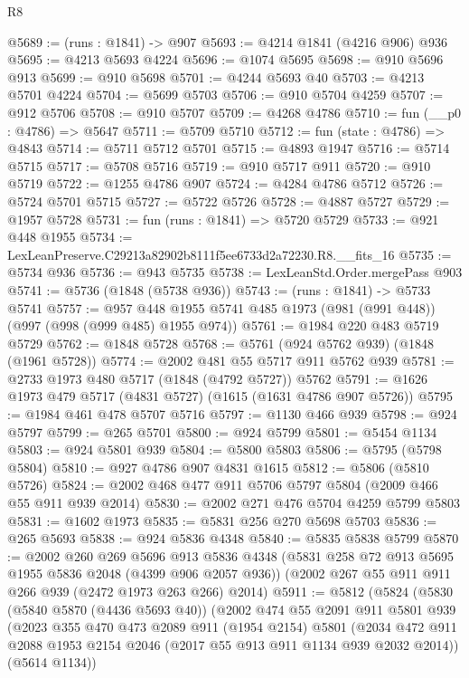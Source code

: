 \begin{lexlean}{R8}
\begin{coremodule}
@5689 := (runs : @1841) -> @907
@5693 := @4214 @1841 (@4216 @906) @936
@5695 := @4213 @5693 @4224
@5696 := @1074 @5695
@5698 := @910 @5696 @913
@5699 := @910 @5698
@5701 := @4244 @5693 @40
@5703 := @4213 @5701 @4224
@5704 := @5699 @5703
@5706 := @910 @5704 @4259
@5707 := @912 @5706
@5708 := @910 @5707
@5709 := @4268 @4786
@5710 := fun (__p0 : @4786) => @5647
@5711 := @5709 @5710
@5712 := fun (state : @4786) => @4843
@5714 := @5711 @5712 @5701
@5715 := @4893 @1947
@5716 := @5714 @5715
@5717 := @5708 @5716
@5719 := @910 @5717 @911
@5720 := @910 @5719
@5722 := @1255 @4786 @907
@5724 := @4284 @4786 @5712
@5726 := @5724 @5701 @5715
@5727 := @5722 @5726
@5728 := @4887 @5727
@5729 := @1957 @5728
@5731 := fun (runs : @1841) => @5720 @5729
@5733 := @921 @448 @1955
@5734 := LexLeanPreserve.C29213a82902b8111f5ee6733d2a72230.R8.__fits_16
@5735 := @5734 @936
@5736 := @943 @5735
@5738 := LexLeanStd.Order.mergePass @903
@5741 := @5736 (@1848 (@5738 @936))
@5743 := (runs : @1841) -> @5733 @5741
@5757 := @957 @448 @1955 @5741 @485 @1973 (@981 (@991 @448)) (@997 (@998 (@999 @485) @1955 @974))
@5761 := @1984 @220 @483 @5719 @5729
@5762 := @1848 @5728
@5768 := @5761 (@924 @5762 @939) (@1848 (@1961 @5728))
@5774 := @2002 @481 @55 @5717 @911 @5762 @939
@5781 := @2733 @1973 @480 @5717 (@1848 (@4792 @5727)) @5762
@5791 := @1626 @1973 @479 @5717 (@4831 @5727) (@1615 (@1631 @4786 @907 @5726))
@5795 := @1984 @461 @478 @5707 @5716
@5797 := @1130 @466 @939
@5798 := @924 @5797
@5799 := @265 @5701
@5800 := @924 @5799
@5801 := @5454 @1134
@5803 := @924 @5801 @939
@5804 := @5800 @5803
@5806 := @5795 (@5798 @5804)
@5810 := @927 @4786 @907 @4831 @1615
@5812 := @5806 (@5810 @5726)
@5824 := @2002 @468 @477 @911 @5706 @5797 @5804 (@2009 @466 @55 @911 @939 @2014)
@5830 := @2002 @271 @476 @5704 @4259 @5799 @5803
@5831 := @1602 @1973
@5835 := @5831 @256 @270 @5698 @5703
@5836 := @265 @5693
@5838 := @924 @5836 @4348
@5840 := @5835 @5838 @5799
@5870 := @2002
    @260
    @269
    @5696
    @913
    @5836
    @4348
    (@5831 @258 @72 @913 @5695 @1955 @5836 @2048 (@4399 @906 @2057 @936))
    (@2002 @267 @55 @911 @911 @266 @939 (@2472 @1973 @263 @266) @2014)
@5911 := @5812
    (@5824
      (@5830
        (@5840 @5870 (@4436 @5693 @40))
        (@2002
          @474
          @55
          @2091
          @911
          @5801
          @939
          (@2023
            @355
            @470
            @473
            @2089
            @911
            (@1954 @2154)
            @5801
            (@2034 @472 @911 @2088 @1953 @2154 @2046 (@2017 @55 @913 @911 @1134 @939 @2032 @2014))
            (@5614 @1134))

\end{coremodule}
\end{lexlean}
